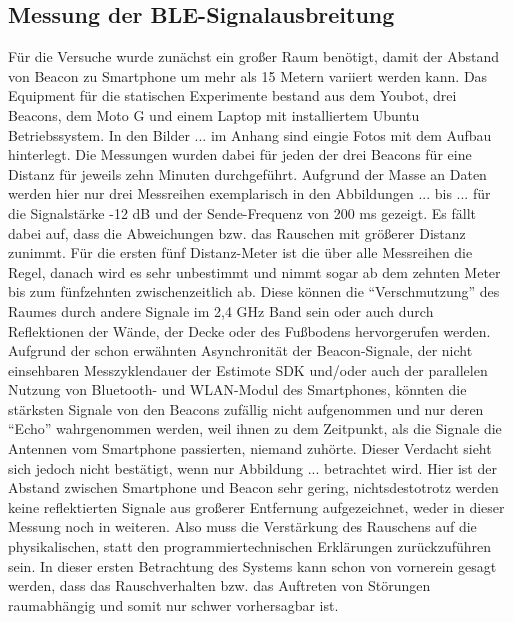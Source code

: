 \subsection{Messung der BLE-Signalausbreitung}\label{sec:MessungBLE}
Für die Versuche wurde zunächst ein großer Raum benötigt, damit der Abstand von Beacon zu Smartphone um mehr als 15 Metern variiert werden kann. Das Equipment für die statischen Experimente bestand aus dem Youbot, drei Beacons, dem Moto G und einem Laptop mit installiertem Ubuntu Betriebssystem. In den Bilder ... im Anhang sind eingie Fotos mit dem Aufbau hinterlegt. Die Messungen wurden dabei für jeden der drei Beacons für eine Distanz für jeweils zehn Minuten durchgeführt. Aufgrund der Masse an Daten werden hier nur drei Messreihen exemplarisch in den Abbildungen ... bis ... für die Signalstärke -12 dB und der Sende-Frequenz von 200 ms gezeigt. Es fällt dabei auf, dass die Abweichungen bzw. das Rauschen mit größerer Distanz zunimmt. Für die ersten fünf Distanz-Meter ist die über alle Messreihen die Regel, danach wird es sehr unbestimmt und nimmt sogar ab dem zehnten Meter bis zum fünfzehnten zwischenzeitlich ab. Diese können die "`Verschmutzung"' des Raumes durch andere Signale im 2,4 GHz Band sein oder auch durch Reflektionen der Wände, der Decke oder des Fußbodens hervorgerufen werden. Aufgrund der schon erwähnten Asynchronität der Beacon-Signale, der nicht einsehbaren Messzyklendauer der Estimote SDK und/oder auch der parallelen Nutzung von Bluetooth- und WLAN-Modul des Smartphones, könnten die stärksten Signale von den Beacons zufällig nicht aufgenommen und nur deren "`Echo"' wahrgenommen werden, weil ihnen zu dem Zeitpunkt, als die Signale die Antennen vom Smartphone passierten, niemand zuhörte. Dieser Verdacht sieht sich jedoch nicht bestätigt, wenn nur Abbildung ... betrachtet wird. Hier ist der Abstand zwischen Smartphone und Beacon sehr gering, nichtsdestotrotz werden keine reflektierten Signale aus großerer Entfernung aufgezeichnet, weder in dieser Messung noch in weiteren. Also muss die Verstärkung des Rauschens auf die physikalischen, statt den programmiertechnischen Erklärungen zurückzuführen sein. In dieser ersten Betrachtung des Systems kann schon von vornerein gesagt werden, dass das Rauschverhalten bzw. das Auftreten von Störungen raumabhängig und somit nur schwer vorhersagbar ist. \\ \\
